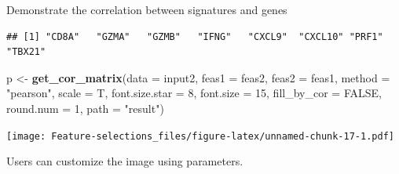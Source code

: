 \documentclass[
  12pt,
]{book}
\newenvironment{Shaded}{\begin{snugshade}}{\end{snugshade}}
\newcommand{\AttributeTok}[1]{\textcolor[rgb]{0.13,0.29,0.53}{#1}}
\newcommand{\ConstantTok}[1]{\textcolor[rgb]{0.56,0.35,0.01}{#1}}
\newcommand{\DecValTok}[1]{\textcolor[rgb]{0.00,0.00,0.81}{#1}}
\newcommand{\FunctionTok}[1]{\textcolor[rgb]{0.13,0.29,0.53}{\textbf{#1}}}
\newcommand{\NormalTok}[1]{#1}
\newcommand{\OtherTok}[1]{\textcolor[rgb]{0.56,0.35,0.01}{#1}}
\newcommand{\SpecialCharTok}[1]{\textcolor[rgb]{0.81,0.36,0.00}{\textbf{#1}}}
\newcommand{\StringTok}[1]{\textcolor[rgb]{0.31,0.60,0.02}{#1}}
\begin{document}
Demonstrate the correlation between signatures and genes

\begin{Shaded}
\end{Shaded}

\begin{verbatim}
## [1] "CD8A"   "GZMA"   "GZMB"   "IFNG"   "CXCL9"  "CXCL10" "PRF1"   "TBX21"
\end{verbatim}

\begin{Shaded}
\begin{Highlighting}[]
\NormalTok{p }\OtherTok{\textless{}{-}} \FunctionTok{get\_cor\_matrix}\NormalTok{(}\AttributeTok{data           =}\NormalTok{ input2, }
                    \AttributeTok{feas1          =}\NormalTok{ feas2, }
                    \AttributeTok{feas2          =}\NormalTok{ feas1,}
                    \AttributeTok{method         =} \StringTok{"pearson"}\NormalTok{,}
                    \AttributeTok{scale          =}\NormalTok{ T, }
                    \AttributeTok{font.size.star =} \DecValTok{8}\NormalTok{, }
                    \AttributeTok{font.size      =} \DecValTok{15}\NormalTok{, }
                    \AttributeTok{fill\_by\_cor    =} \ConstantTok{FALSE}\NormalTok{, }
                    \AttributeTok{round.num      =} \DecValTok{1}\NormalTok{,}
                    \AttributeTok{path           =} \StringTok{"result"}\NormalTok{)}
\end{Highlighting}
\end{Shaded}

\texttt{[image: Feature-selections\_files/figure-latex/unnamed-chunk-17-1.pdf]}

Users can customize the image using parameters.
\end{document}
